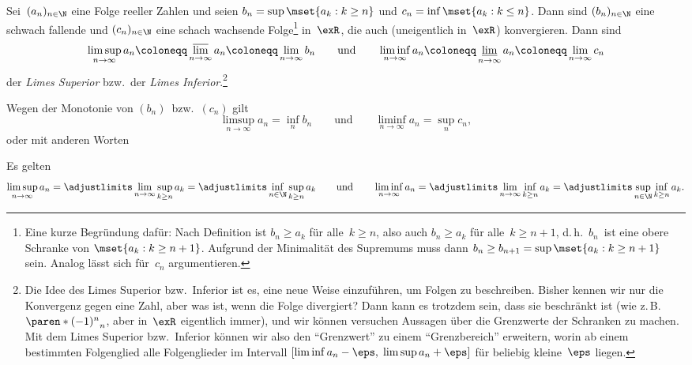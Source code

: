 \documentclass[a4paper]{article}
\begin{document}
\begin{definition}
    Sei~$(a_n)_{n\in\N}$ eine Folge reeller Zahlen und seien $b_n = \sup\mset{a_k : k \geq n}$ und $c_n = \inf\mset{a_k : k \leq n}$. Dann sind $(b_n)_{n\in\N}$ eine schwach fallende und $(c_n)_{n\in\N}$ eine schach wachsende Folge\footnote{Eine kurze Begründung dafür: Nach Definition ist $b_n \geq a_k$ für alle~$k \geq n$, also auch $b_n \geq a_k$ für alle~$k \geq n+1$, d.\,h.\ $b_n$~ist eine obere Schranke von $\mset{a_k : k \geq n+1}$. Aufgrund der Minimalität des Supremums muss dann $b_n \geq b_{n+1} = \sup\mset{a_k : k \geq n+1}$ sein. Analog lässt sich für~$c_n$ argumentieren.} in~$\exR$, die auch (uneigentlich in~$\exR$) konvergieren. Dann sind
    \begin{equation*}
        \limsup_{n\to\infty} a_n \coloneqq \varlimsup_{n\to\infty} a_n \coloneqq \lim_{n\to\infty} b_n \qquad\text{und}\qquad \liminf_{n\to\infty} a_n \coloneqq \varliminf_{n\to\infty} a_n \coloneqq \lim_{n\to\infty} c_n
    \end{equation*}
    der \emph{Limes Superior} bzw.\ der \emph{Limes Inferior}.\footnote{Die Idee des Limes Superior bzw.\ Inferior ist es, eine neue Weise einzuführen, um Folgen zu beschreiben. Bisher kennen wir nur die Konvergenz gegen eine Zahl, aber was ist, wenn die Folge divergiert? Dann kann es trotzdem sein, dass sie beschränkt ist (wie z.\,B.\ $\paren*{(-1)^n}_n$, aber in~$\exR$ eigentlich immer), und wir können versuchen Aussagen über die Grenzwerte der Schranken zu machen. Mit dem Limes Superior bzw.\ Inferior können wir also den "`Grenzwert"' zu einem "`Grenzbereich"' erweitern, worin ab einem bestimmten Folgenglied alle Folgenglieder im Intervall $[\liminf a_n-\eps,\; \limsup a_n+\eps]$ für beliebig kleine~$\eps$ liegen.}
\end{definition}

Wegen der Monotonie von $(b_n)$~bzw.~$(c_n)$ gilt
\begin{equation*}
    \limsup_{n\to\infty} a_n = \inf_n b_n \qquad\text{und}\qquad \liminf_{n\to\infty} a_n = \sup_n c_n,
\end{equation*}
oder mit anderen Worten
\begin{lemma}\label{lem:infsup}
    Es gelten
    \begin{equation*}
        \limsup_{n\to\infty} a_n = \adjustlimits\lim_{n\to\infty} \sup_{k\geq n} a_k = \adjustlimits\inf_{n\in\N} \sup_{k\geq n} a_k \qquad\text{und}\qquad \liminf_{n\to\infty} a_n = \adjustlimits\lim_{n\to\infty} \inf_{k\geq n} a_k = \adjustlimits\sup_{n\in\N} \inf_{k\geq n} a_k.
    \end{equation*}
\end{lemma}
\end{document}

